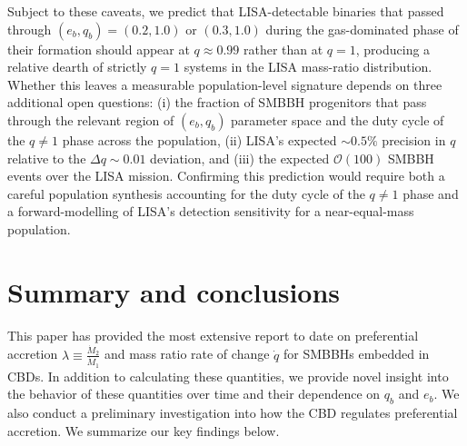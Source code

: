 \documentclass[fleqn,usenatbib]{mnras}
\begin{document}
Subject to these caveats, we predict that LISA-detectable binaries that passed through $(e_b, q_b) = (0.2, 1.0)$ or $(0.3, 1.0)$ during the gas-dominated phase of their formation should appear at $q \approx 0.99$ rather than at $q = 1$, producing a relative dearth of strictly $q = 1$ systems in the LISA mass-ratio distribution. Whether this leaves a measurable population-level signature depends on three additional open questions: (i) the fraction of SMBBH progenitors that pass through the relevant region of $(e_b, q_b)$ parameter space and the duty cycle of the $q \neq 1$ phase across the population, (ii) LISA's expected ${\sim}0.5\%$ precision in $q$ \citep{Mangiagli_2020} relative to the $\Delta q \sim 0.01$ deviation, and (iii) the expected $\mathcal{O}(100)$ SMBBH events over the LISA mission. Confirming this prediction would require both a careful population synthesis accounting for the duty cycle of the $q \neq 1$ phase and a forward-modelling of LISA's detection sensitivity for a near-equal-mass population.

\section{Summary and conclusions}\label{sec:conclusion}
This paper has provided the most extensive report to date on preferential accretion $\lambda \equiv \frac{\dot{M}_2}{\dot{M}_1}$ and mass ratio rate of change $\dot{q}$ for SMBBHs embedded in CBDs. In addition to calculating these quantities, we provide novel insight into the behavior of these quantities over time and their dependence on $q_b$ and $e_b$. We also conduct a preliminary investigation into how the CBD regulates preferential accretion. We summarize our key findings below.
\end{document}
